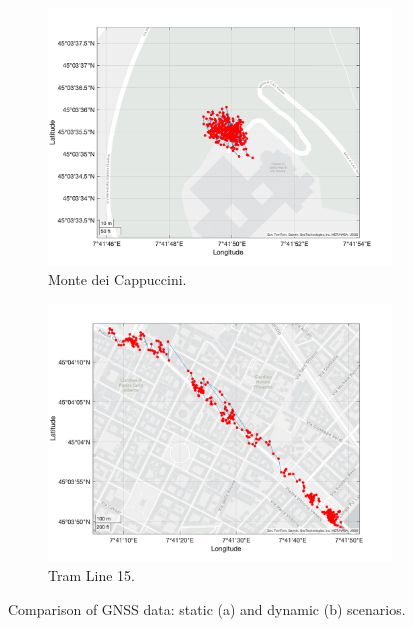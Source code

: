         \vspace{-0.5cm} %

        \begin{figure}[h!]
            \centering
            \begin{subfigure}{0.23\textwidth}
                \centering
                \includegraphics[width=\textwidth]{images/tests/Monte_Cappuccini/png/Samsung_A51_Monte_Cappuccini_fig6.png}
                \caption{Monte dei Cappuccini.}
                \label{fig:static_scenario}
            \end{subfigure}
            \hfill
            \begin{subfigure}{0.23\textwidth}
                \centering
                \includegraphics[width=\textwidth]{images/tests/Tram_15_trip_Castello_to_Pescatore/filtered/Samsung_A51_Tram_15_trip_Castello_to_Pescatore_fig6.png}
                \caption{Tram Line 15.}
                \label{fig:dynamic_scenario}
            \end{subfigure}
            \vspace{0.35cm}
            \caption{Comparison of GNSS data: static (a) and dynamic (b) scenarios.}
            \label{fig:gnss_comparison}
        \end{figure}

